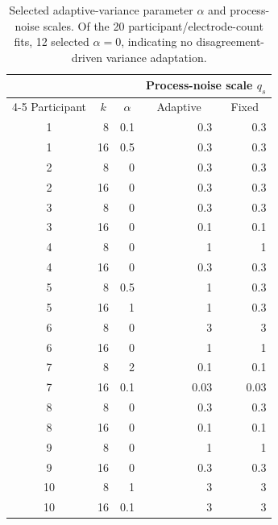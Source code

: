 \documentclass[preprint,12pt]{elsarticle}
\begin{document}
\begin{table}[htbp]
\caption{Selected adaptive-variance parameter $\alpha$ and process-noise scales. Of the 20 participant/electrode-count fits, 12 selected $\alpha=0$, indicating no disagreement-driven variance adaptation.}
\centering
\small
\setlength{\tabcolsep}{7pt}
\begin{tabular}{crrrr}
\toprule
& & & \multicolumn{2}{c}{Process-noise scale $q_s$} \\
\cmidrule(lr){4-5}
Participant
& \multicolumn{1}{c}{$k$}
& \multicolumn{1}{c}{$\alpha$}
& \multicolumn{1}{c}{Adaptive}
& \multicolumn{1}{c}{Fixed} \\
\midrule
1  & 8  & 0.1 & 0.3  & 0.3  \\
1  & 16 & 0.5 & 0.3  & 0.3  \\
2  & 8  & 0   & 0.3  & 0.3  \\
2  & 16 & 0   & 0.3  & 0.3  \\
3  & 8  & 0   & 0.3  & 0.3  \\
3  & 16 & 0   & 0.1  & 0.1  \\
4  & 8  & 0   & 1    & 1    \\
4  & 16 & 0   & 0.3  & 0.3  \\
5  & 8  & 0.5 & 1    & 0.3  \\
5  & 16 & 1   & 1    & 0.3  \\
6  & 8  & 0   & 3    & 3    \\
6  & 16 & 0   & 1    & 1    \\
7  & 8  & 2   & 0.1  & 0.1  \\
7  & 16 & 0.1 & 0.03 & 0.03 \\
8  & 8  & 0   & 0.3  & 0.3  \\
8  & 16 & 0   & 0.1  & 0.1  \\
9  & 8  & 0   & 1    & 1    \\
9  & 16 & 0   & 0.3  & 0.3  \\
10 & 8  & 1   & 3    & 3    \\
10 & 16 & 0.1 & 3    & 3    \\
\bottomrule
\end{tabular}
\end{table}
\end{document}
